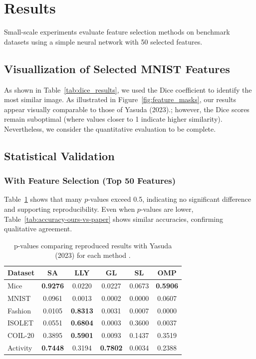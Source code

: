 \documentclass[a4paper,twocolumn]{article} %
\begin{document}
\section{Results}
Small-scale experiments evaluate feature selection methods on benchmark datasets using a simple neural network with 50 selected features.
\subsection{Visuallization of Selected MNIST Features}

As shown in Table~\ref{tab:dice_results}, we used the Dice coefficient to identify the most similar image. As illustrated in Figure~\ref{fig:feature_masks}, our results appear visually comparable to those of Yasuda (2023).; however, the Dice scores remain suboptimal (where values closer to 1 indicate higher similarity). Nevertheless, we consider the quantitative evaluation to be complete.



\subsection{Statistical Validation}
\subsubsection*{With Feature Selection (Top 50 Features)}
Table~\ref{tab:methodwise-pval} shows that many $p$-values exceed 0.5, indicating no significant difference and supporting reproducibility. Even when $p$-values are lower, Table~\ref{tab:accuracy-ours-vs-paper} shows similar accuracies, confirming qualitative agreement.
\begin{table}[ht]
\centering
\scriptsize
\caption{p-values comparing reproduced results with Yasuda (2023) for each method .}
\begin{tabular}{lccccc}
\hline
\textbf{Dataset} & \textbf{SA} & \textbf{LLY} & \textbf{GL} & \textbf{SL} & \textbf{OMP} \\
\hline
Mice     & \textbf{0.9276} & 0.0220 & 0.0227 & 0.0673 & \textbf{0.5906} \\
MNIST    & 0.0961 & 0.0013 & 0.0002 & 0.0000 & 0.0607 \\
Fashion  & 0.0105 & \textbf{0.8313} & 0.0031 & 0.0007 & 0.0000 \\
ISOLET   & 0.0551 & \textbf{0.6804} & 0.0003 & 0.3600 & 0.0037 \\
COIL-20  & 0.3895 & \textbf{0.5901} & 0.0093 & 0.1437 & 0.3519 \\
Activity & \textbf{0.7448} & 0.3194 & \textbf{0.7802} & 0.0034 & 0.2388 \\
\hline
\end{tabular}
\label{tab:methodwise-pval}
\end{table}
\end{document}

